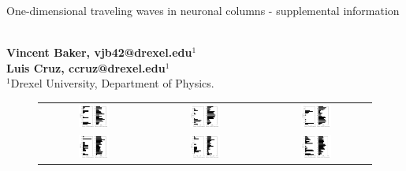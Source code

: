 \documentclass[12pt]{article}
\begin{document}
\vspace{20mm}

{\LARGE One-dimensional traveling waves in neuronal columns - supplemental information}

\ \\
{\bf \large Vincent Baker, vjb42@drexel.edu$^{\displaystyle 1}$}\\
{\bf \large Luis Cruz, ccruz@drexel.edu$^{\displaystyle 1}$}\\
{$^{\displaystyle 1}$Drexel University, Department of Physics.}\\

\pagebreak
 
\begin{figure}[!htb]
 \begin{tabular}{ccc}
     \includegraphics[width=0.3\textwidth]{fig/ccf/ccf1} & \includegraphics[width=0.3\textwidth]{fig/ccf/ccf2} & \includegraphics[width=0.3\textwidth]{fig/ccf/ccf3} \\
     \includegraphics[width=0.3\textwidth]{fig/ccf/ccf4} & \includegraphics[width=0.3\textwidth]{fig/ccf/ccf5} & \includegraphics[width=0.3\textwidth]{fig/ccf/ccf6} \\

\end{tabular}
\end{figure}
\end{document}
